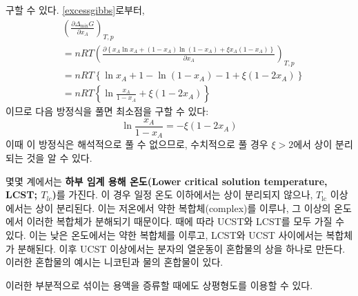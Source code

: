         구할 수 있다. \ref{excessgibbs}로부터,
        \begin{equation*}
            \begin{aligned}
                &\left(\frac{\partial \Delta_\mathrm{mix}G}{\partial x_A}\right)_{T,p} \\
                &= nRT\left(\frac{\partial\left\{x_A\ln{x_A}+\left(1-x_A\right)\ln{\left(1-x_A\right)}+\xi x_A\left(1-x_A\right)\right\}}{\partial x_A}\right)_{T,p}\\
                &= nRT\left\{\ln{x_A}+1-\ln{\left(1-x_A\right)}-1+\xi\left(1-2x_A\right)\right\}\\
                &= nRT\left\{\ln{\frac{x_A}{1-x_A}}+\xi\left(1-2x_A\right)\right\}
            \end{aligned}
        \end{equation*}
        이므로 다음 방정식을 풀면 최소점을 구할 수 있다:
        \begin{equation*}
            \ln{\frac{x_A}{1-x_A}}=-\xi\left(1-2x_A\right)
        \end{equation*}
        이때 이 방정식은 해석적으로 풀 수 없으므로, 수치적으로 풀 경우 $\xi > 2$에서 상이 분리되는 것을 알 수 있다.
        \par 몇몇 계에서는 \textbf{하부 임계 용해 온도(Lower critical solution temperature, LCST; $T_{lc}$)}를 가진다. 
        이 경우 일정 온도 이하에서는 상이 분리되지 않으나, $T_\mathrm{lc}$ 이상에서는 상이 분리된다. 이는 저온에서 
        약한 복합체(complex)를 이루나, 그 이상의 온도에서 이러한 복합체가 분해되기 때문이다. 
        때에 따라 UCST와 LCST를 모두 가질 수 있다. 이는 낮은 온도에서는 약한 복합체를 이루고, LCST와 UCST 사이에서는 복합체가 분해된다. 
        이후 UCST 이상에서는 분자의 열운동이 혼합물의 상을 하나로 만든다. 이러한 혼합물의 예시는 니코틴과 물의 혼합물이 있다.
        \par 이러한 부분적으로 섞이는 용액을 증류할 때에도 상평형도를 이용할 수 있다. 
